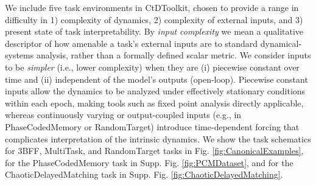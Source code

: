 \documentclass{article}
\begin{document}
We include five task environments in CtDToolkit, chosen to provide a range in difficulty in 1) complexity of dynamics, 2) complexity of external inputs, and 3) present state of task interpretability. By \textit{input complexity} we mean a qualitative descriptor of how amenable a task's external inputs are to standard dynamical-systems analysis, rather than a formally defined scalar metric. We consider inputs to be \textit{simpler} (i.e., lower complexity) when they are (i) piecewise constant over time and (ii) independent of the model's outputs (open-loop). Piecewise constant inputs allow the dynamics to be analyzed under effectively stationary conditions within each epoch, making tools such as fixed point analysis directly applicable, whereas continuously varying or output-coupled inputs (e.g., in PhaseCodedMemory or RandomTarget) introduce time-dependent forcing that complicates interpretation of the intrinsic dynamics. We show the task schematics for 3BFF, MultiTask, and RandomTarget tasks in Fig. \ref{fig:CanonicalExamples}, for the PhaseCodedMemory task in Supp. Fig. \ref{fig:PCMDataset}, and for the ChaoticDelayedMatching task in Supp. Fig. \ref{fig:ChaoticDelayedMatching}.
\end{document}
